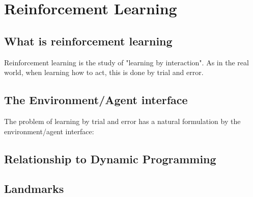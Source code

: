 \section{Reinforcement Learning}


\subsection{What is reinforcement learning}

Reinforcement learning is the study of "learning by interaction". As in the real world, when learning how to act, this is done by trial and error.

\subsection{The Environment/Agent interface}

The problem of learning by trial and error has a natural formulation by the environment/agent interface:



\subsection{Relationship to Dynamic Programming}

\subsection{Landmarks}